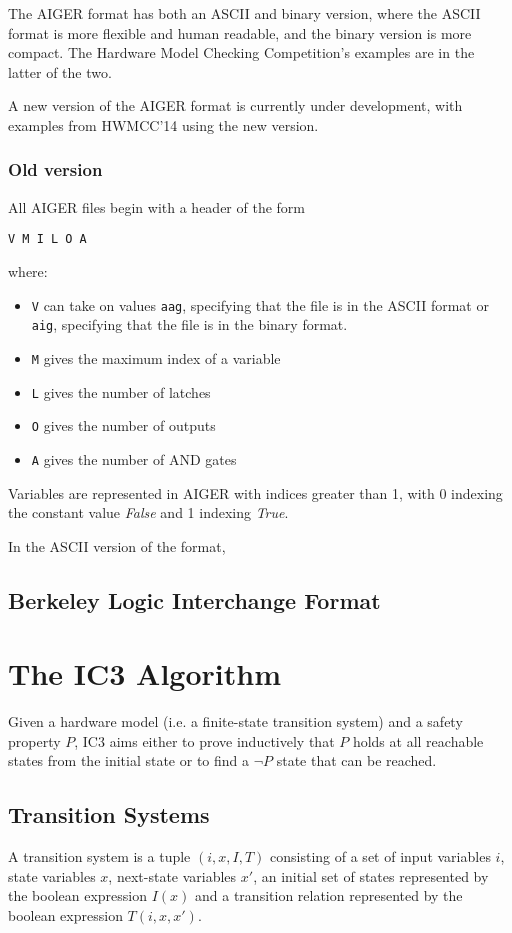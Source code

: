 \documentclass[12pt,a4paper,twoside,openright]{report}
\begin{document}
The AIGER format has both an ASCII and binary version, where the ASCII format is more flexible and human readable,
and the binary version is more compact. The Hardware Model Checking Competition's examples
are in the latter of the two.

A new version of the AIGER format is currently under development, with examples from HWMCC'14
using the new version.

\subsubsection{Old version}

All AIGER files begin with a header of the form
\begin{verbatim}
V M I L O A
\end{verbatim}
where:
\begin{itemize}
\item \verb,V, can take on values \verb,aag,, specifying that the file is in the ASCII format or \verb,aig,,
specifying that the file is in the binary format.
\item \verb,M, gives the maximum index of a variable
\item \verb,L, gives the number of latches
\item \verb,O, gives the number of outputs
\item \verb,A, gives the number of AND gates
\end{itemize}

Variables are represented in AIGER with indices greater than 1, with 0 indexing the constant
value {\it False} and 1 indexing {\it True}.

In the ASCII version of the format,

\subsection{Berkeley Logic Interchange Format}

\section{The IC3 Algorithm}
Given a hardware model (i.e. a finite-state transition system) and a safety property $P$, IC3
aims either to prove inductively that $P$ holds at all reachable states from the initial state or
to find a $\neg P$ state that can be reached.

\subsection{Transition Systems}
A transition system is a tuple $(i,x,I,T)$ consisting of a set of input variables $i$, state variables $x$,
next-state variables $x'$, an initial set of states represented by the boolean expression $I(x)$ and
a transition relation represented by the boolean expression $T(i,x,x')$.
\end{document}
